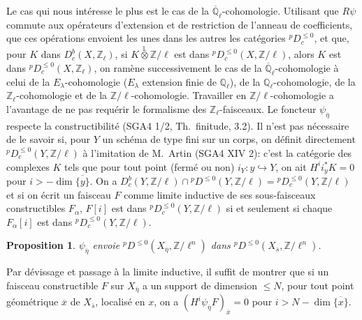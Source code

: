 \documentclass[12pt,a4paper]{article}
\theoremstyle{plain}
\newtheorem{proposition}[theorem]{Proposition}
\theoremstyle{definition}
\newcommand{\into}{\hookrightarrow}
\begin{document}
Le cas qui nous int\'{e}resse le plus est le cas de la $\overline{\mathbb{Q}}_{\ell}$-cohomologie. Utilisant que $R\psi$ commute aux op\'{e}rateurs d'extension et de restriction de l'anneau de coefficients, que ces op\'{e}rations envoient les unes dans les autres les cat\'{e}gories ${}^{p}D_{c}^{\leq 0}$, et que, pour $K$ dans $D_{c}^{b}(X,\mathbb{Z}_{\ell})$, si $K \overset{\mathbb{L}}{\otimes} \mathbb{Z}/\ell$ est dans ${}^{p}D_{c}^{\leq 0}(X,\mathbb{Z}/\ell)$, alors $K$ est dans ${}^{p}D_{c}^{\leq 0}(X,\mathbb{Z}_{\ell})$, on ram\`{e}ne successivement le cas de la $\overline{\mathbb{Q}}_{\ell}$-cohomologie \`{a} celui de la $E_{\lambda}$-cohomologie ($E_{\lambda}$ extension finie de $\mathbb{Q}_{\ell}$), de la $\mathbb{Q}_{\ell}$-cohomologie, de la $\mathbb{Z}_{\ell}$-cohomologie et de la $\mathbb{Z}/\ell$-cohomologie. Travailler en $\mathbb{Z}/\ell$-cohomologie a l'avantage de ne pas requ\'{e}rir le formalisme des $\mathbb{Z}_{\ell}$-faisceaux. Le foncteur $\psi_{\overline{\eta}}$ respecte la constructibilit\'{e} (SGA4 1/2, Th.\ finitude, 3.2). Il n'est pas n\'{e}cessaire de le savoir si, pour $Y$ un sch\'{e}ma de type fini sur un corps, on d\'{e}finit directement ${}^{p}D_{c}^{\leq 0}(Y,\mathbb{Z}/\ell)$ \`{a} l'imitation de M.~Artin (SGA4 XIV 2): c'est la cat\'{e}gorie des complexes $K$ tels que pour tout point (ferm\'{e} ou non) $i_{Y}: y \into Y$, on ait $H^{i}i_{y}^{*}K = 0$ pour $i > -\dim\overline{\{y\}}$. On a $D_{c}^{b}(Y,\mathbb{Z}/\ell) \cap {}^{p}D^{\leq 0}(Y,\mathbb{Z}/\ell) = {}^{p}D_{c}^{\leq 0}(Y,\mathbb{Z}/\ell)$ et si on \'{e}crit un faisceau $F$ comme limite inductive de ses sous-faisceaux constructibles $F_{\alpha}$, $F[i]$ est dans ${}^{p}D_{c}^{\leq 0}(Y,\mathbb{Z}/\ell)$ si et seulement si chaque $F_{\alpha}[i]$ est dans ${}^{p}D_{c}^{\leq 0}(Y,\mathbb{Z}/\ell)$.

\begin{proposition}\label{prop:4.4.2}
$\psi_{\overline{\eta}}$ envoie ${}^{p}D^{\leq 0}(X_{\overline{\eta}}, \mathbb{Z}/\ell^{n})$ dans ${}^{p}D^{\leq 0}(X_{\overline{s}}, \mathbb{Z}/\ell^{n})$.
\end{proposition}

Par d\'{e}vissage et passage \`{a} la limite inductive, il suffit de montrer que si un faisceau constructible $F$ sur $X_{\overline{\eta}}$ a un support de dimension $\leq N$, pour tout point g\'{e}om\'{e}trique $\overline{x}$ de $X_{\overline{s}}$, localis\'{e} en $x$, on a $(H^{i}\psi_{\overline{\eta}}F)_{\overline{x}} = 0$ pour $i > N - \dim\overline{\{x\}}$.
\end{document}
